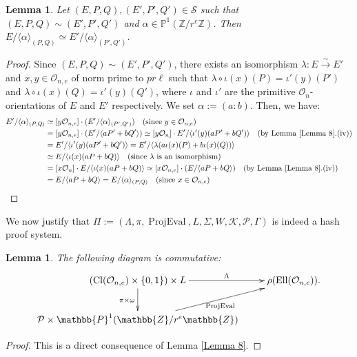 \documentclass[a4paper,10pt]{report}
\theoremstyle{definition}
\theoremstyle{plain}
\newtheorem{Lemma}[Definition]{Lemma}
\theoremstyle{definition}
\newcommand{\Z}{\mathbb{Z}}
\newcommand{\m}[1]{\mathcal{#1}}
\newcommand{\mO}{\mathcal{O}}
\renewcommand{\(}{\left(}
\renewcommand{\)}{\right)}
\renewcommand{\P}{\mathbb{P}}
\DeclareMathOperator{\Cl}{Cl}
\DeclareMathOperator{\Ell}{Ell}
\DeclareMathOperator{\ProjEval}{ProjEval}
\begin{document}
\begin{Lemma}\label{Lemma 9}
Let $(E,P,Q), (E',P',Q')\in \m{S}$ such that $(E,P,Q)\sim (E',P',Q')$ and $\alpha\in\P^1(\Z/r^e\Z)$.  Then $E/\langle\alpha\rangle_{(P,Q)}\simeq E'/\langle\alpha\rangle_{(P',Q')}$.
\end{Lemma}

\begin{proof}
Since $(E,P,Q)\sim (E',P',Q')$, there exists an isomorphism $\lambda:E\overset{\sim}{\longrightarrow} E'$ and $x, y\in\mO_{n,e}$ of norm prime to $pr\ell$ such that $\lambda\circ\iota(x)(P)=\iota'(y)(P')$ and $\lambda\circ\iota(x)(Q)=\iota'(y)(Q')$, where $\iota$ and $\iota'$ are the primitive $\mO_n$-orientations of $E$ and $E'$ respectively.  We set $\alpha:=(a:b)$. Then, we have:
\begin{align*}
E'/\langle\alpha\rangle_{(P,Q)}&\simeq [y\mO_{n,e}]\cdot(E'/\langle\alpha\rangle_{(P',Q')}) \quad (\mbox{since } y\in\mO_{n,e})\\
&=[y\mO_{n,e}]\cdot(E'/\langle aP'+bQ' \rangle)\simeq [y\mO_n]\cdot E'/\langle \iota'(y)(aP'+bQ')\rangle \quad (\mbox{by Lemma \ref{Lemma 8}.(iv)})\\
&= E'/\langle \iota'(y)(aP'+bQ')\rangle=E'/\langle \lambda(a\iota(x)(P)+b\iota(x)(Q))\rangle \\
&\simeq E/\langle \iota(x)(aP+bQ)\rangle\quad (\mbox{since } \lambda \mbox{ is an isomorphism})\\
&=[x\mO_n]\cdot E/\langle \iota(x)(aP+bQ)\rangle\simeq [x\mO_{n,e}]\cdot (E/\langle aP+bQ \rangle) \quad (\mbox{by Lemma \ref{Lemma 8}.(iv)})\\
&=E/\langle aP+bQ \rangle=E/\langle\alpha\rangle_{(P,Q)} \quad (\mbox{since } x\in\mO_{n,e})
\end{align*}
\end{proof}

We now justify that $\Pi:=(\Lambda,\pi,\ProjEval,L,\Sigma,W,\m{K},\m{P},\Gamma)$ is indeed a hash proof system.

\begin{Lemma}
The following diagram is commutative:
\[\xymatrix{
(\Cl(\mO_{n,e})\times\{0,1\})\times L  \ar[r]^-{\Lambda} \ar[d]_{\pi\times\omega} & \rho(\Ell(\mO_{n,e})).\\
\m{P}\times \P^1(\Z/r^e\Z) \ar[ru]_{\ProjEval} &
}\]
\end{Lemma}

\begin{proof}
This is a direct consequence of Lemma \ref{Lemma 8}.
\end{proof}
\end{document}
